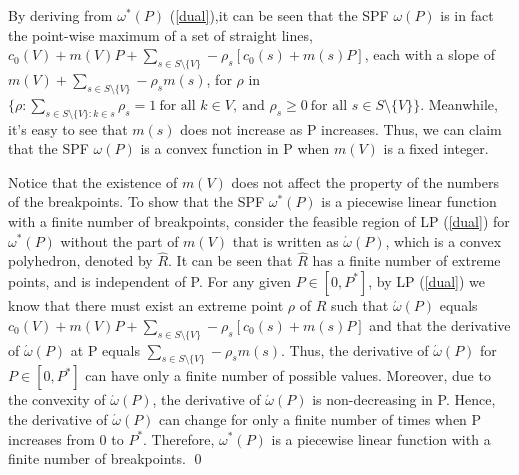 \begin{pf}[Theorem 1]

By deriving from $\omega^* (P)$ (\ref{dual}),it can be seen that the SPF $\omega(P)$ is in fact the point-wise maximum of a set of straight lines, $c_0(V)+m(V)P+\sum_{s\in S\setminus\{V\}}-\rho_s[c_0(s)+m(s)P]$, each with a slope of $m(V)+\sum_{s\in S\setminus\{V\}} −\rho_s m(s)$, for $\rho$ in $\{\rho :\sum_{s\in S\setminus \{V\}:k\in s} \rho_s=1\  \text{for all }  k\in V,\ \text{and } \rho_s \geq 0\ \text{for all } s\in S\setminus \{V\} \}$.
Meanwhile, it's easy to see that $m(s)$ does not increase as P increases. Thus, we can claim that the SPF $\omega(P)$ is a convex function in P when $m(V)$ is a fixed integer.

Notice that the existence of $m(V)$ does not affect the property of the numbers of the breakpoints.
To show that the SPF $\omega^* (P)$ is a piecewise linear function with a ﬁnite number of breakpoints, consider the feasible region of LP (\ref{dual}) for $\omega^* (P)$ without the part of $m(V)$ that is written as $\acute{\omega} (P)$, which is a convex polyhedron, denoted by $\hat{R}$. It can be seen that $\hat{R}$ has a ﬁnite number of extreme points, and is independent of P. For any given $P \in [0,P^*]$, by LP (\ref{dual}) we know that there must exist an extreme point $\rho$ of $\hat{R}$ such that $\acute{\omega} (P)$ equals
$c_0(V)+m(V)P+\sum_{s\in S\setminus\{V\}}-\rho_s[c_0(s)+m(s)P]$
and that the derivative of $\acute{\omega} (P)$ at P equals $\sum_{s\in S\setminus\{V\}} −\rho_s m(s)$. Thus, the derivative of $\acute{\omega} (P)$ for $P \in [0,P^*]$ can have only a ﬁnite number of possible values. Moreover, due to the convexity of $\acute{\omega} (P)$, the derivative of $\acute{\omega} (P)$ is non-decreasing in P. Hence, the derivative of $\acute{\omega} (P)$ can change for only a ﬁnite number of times when P increases from 0 to $P^*$. Therefore, $\omega^* (P)$ is a piecewise linear function with a ﬁnite number of breakpoints.
\qed
\end{pf}


